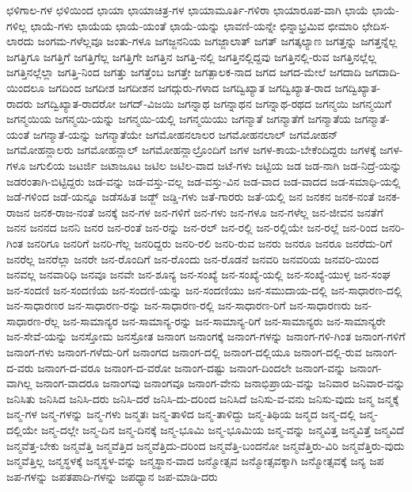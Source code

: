 {ಛಳಿಗಾಲ-ಗಳ
ಛಳಿಯಿಂದ
ಛಾಯಾ
ಛಾಯಾಚಿತ್ರ-ಗಳ
ಛಾಯಾಮೂರ್ತಿ-ಗಳಿರಾ
ಛಾಯಾರೂಪ-ವಾಗಿ
ಛಾಯೆ
ಛಾಯೆ-ಗಳಿಲ್ಲ
ಛಾಯೆ-ಗಳು
ಛಾಯೆಯ
ಛಾಯೆ-ಯಂತೆ
ಛಾಯೆ-ಯನ್ನು
ಛಾವಣಿ-ಯನ್ನೇ
ಛಿನ್ನಾಭ್ರಮಿವ
ಛೀಮಾರಿ
ಛೇದಿಸ-ಲಾರದು
ಜಂಗಮ-ಗಳೆಲ್ಲವೂ
ಜಂತು-ಗಳೂ
ಜಗಜ್ಜನನಿಯ
ಜಗಜ್ಜಾಲಾತ್
ಜಗತ್
ಜಗತ್ಕಲ್ಯಾಣ
ಜಗತ್ತನ್ನು
ಜಗತ್ತನ್ನೆಲ್ಲ
ಜಗತ್ತಿಗೂ
ಜಗತ್ತಿಗೆ
ಜಗತ್ತಿಗೆಲ್ಲ
ಜಗತ್ತಿಗೇ
ಜಗತ್ತಿನ
ಜಗತ್ತಿ-ನಲ್ಲಿ
ಜಗತ್ತಿನಲ್ಲಿದ್ದವು
ಜಗತ್ತಿನಲ್ಲಿ-ರುವ
ಜಗತ್ತಿನಲ್ಲೆಲ್ಲ
ಜಗತ್ತಿನಲ್ಲೆಲ್ಲಾ
ಜಗತ್ತಿ-ನಿಂದ
ಜಗತ್ತು
ಜಗತ್ತೆಂಬ
ಜಗತ್ತೇ
ಜಗತ್ಪಾಲಕ-ನಾದ
ಜಗದ
ಜಗದ-ಮೇಲೆ
ಜಗದಾದಿ
ಜಗದಾದಿ-ಯಿಂದಲೂ
ಜಗದಿಂದ
ಜಗದೀಶ
ಜಗದೀಶನ
ಜಗದ್ಗುರು-ಗಳಾದ
ಜಗದ್ವಿಖ್ಯಾತ
ಜಗದ್ವಿಖ್ಯಾತ-ರಾದ
ಜಗದ್ವಿಖ್ಯಾತ-ರಾದರು
ಜಗದ್ವಿಖ್ಯಾತ-ರಾದರೋ
ಜಗದ್-ವಿಜಯಿ
ಜಗನ್ನಾಥ
ಜಗನ್ನಾಥನ
ಜಗನ್ನಾಥ-ರಥದ
ಜಗನ್ಮಯಿ
ಜಗನ್ಮಯಿಗೆ
ಜಗನ್ಮಯಿಯ
ಜಗನ್ಮಯಿ-ಯನ್ನು
ಜಗನ್ಮಯಿ-ಯಲ್ಲಿ
ಜಗನ್ಮಯಿಯು
ಜಗನ್ಮಾತೆ
ಜಗನ್ಮಾತೆಗೆ
ಜಗನ್ಮಾತೆಯ
ಜಗನ್ಮಾತೆ-ಯಂತೆ
ಜಗನ್ಮಾತೆ-ಯನ್ನು
ಜಗನ್ಮಾತೆಯೇ
ಜಗಮೋಹನಲಾಲರ
ಜಗಮೋಹನಲಾಲ್
ಜಗಮೋಹನ್
ಜಗಮೋಹನ್ಲಾಲರು
ಜಗಮೋಹನ್ಲಾಲ್
ಜಗಮೋಹನ್ಲಾಲ್ರೊಂದಿಗೆ
ಜಗಳ
ಜಗಳ-ಕಾಯ-ಬೇಕೆಂದಿದ್ದರು
ಜಗಳಕ್ಕೆ
ಜಗಳ-ಗಳೂ
ಜಗುಲಿಯ
ಜಟರ್ಜಿ
ಜಟಾಜೂಟ
ಜಟಿಲ
ಜಟಿಲ-ವಾದ
ಜಟೆ-ಗಳು
ಜಟ್ಟಿಯ
ಜಡ
ಜಡ-ನಾಗಿ
ಜಡ-ನಿದ್ರೆ-ಯನ್ನು
ಜಡರಂತಾಗಿ-ಬಿಟ್ಟಿದ್ದರು
ಜಡ-ವನ್ನು
ಜಡ-ವಸ್ತು-ವಲ್ಲ
ಜಡ-ವಸ್ತು-ವಿನ
ಜಡ-ವಾದ
ಜಡ-ವಾದದ
ಜಡ-ಸಮಾಧಿ-ಯಲ್ಲಿ
ಜಡೆ-ಗಳಿಂದ
ಜಡೆ-ಯನ್ನೂ
ಜಡೆಸಹಿತ
ಜಡ್ಜ್
ಜಡ್ಡಿ-ಗಳು
ಜತೆ-ಗಾರರು
ಜತೆ-ಯಲ್ಲಿ
ಜನ
ಜನಕನ
ಜನಕ-ನಂತೆ
ಜನಕ-ರಾಜನ
ಜನಕ-ರಾಜ-ನಂತೆ
ಜನಕ್ಕೆ
ಜನ-ಗಳ
ಜನ-ಗಳಿಗೆ
ಜನ-ಗಳು
ಜನ-ಗಳೂ
ಜನ-ಗಳೆಲ್ಲ
ಜನ-ಜೀವನ
ಜನತೆಗೆ
ಜನನ
ಜನನದ
ಜನನಿ
ಜನರ
ಜನ-ರಂತೆ
ಜನ-ರನ್ನು
ಜನ-ರಲ್
ಜನ-ರಲ್ಲಿ
ಜನ-ರಲ್ಲಿಯೇ
ಜನ-ರಲ್ಲೆ
ಜನ-ರಿಂದ
ಜನರಿ-ಗಿಂತ
ಜನರಿಗೂ
ಜನರಿಗೆ
ಜನರಿ-ಗೆಲ್ಲ
ಜನರಿದ್ದರು
ಜನರಿ-ರಲಿ
ಜನರಿ-ರುವ
ಜನರು
ಜನರೂ
ಜನರೂ
ಜನರೆದು-ರಿಗೆ
ಜನರೆಲ್ಲ
ಜನರೆಲ್ಲಾ
ಜನರೇ
ಜನ-ರೊಂದಿಗೆ
ಜನ-ರೊಂದು
ಜನ-ರೊಡನೆ
ಜನವರಿ
ಜನವರಿಯ
ಜನವರಿ-ಯಿಂದ
ಜನವಲ್ಲ
ಜನವಾರಿಧಿ
ಜನವೂ
ಜನವೇ
ಜನ-ಶೂನ್ಯ
ಜನ-ಸಂಖ್ಯೆ
ಜನ-ಸಂಖ್ಯೆ-ಯಲ್ಲಿ
ಜನ-ಸಂಖ್ಯೆ-ಯುಳ್ಳ
ಜನ-ಸಂಘ
ಜನ-ಸಂದಣಿ
ಜನ-ಸಂದಣಿಯ
ಜನ-ಸಂದಣಿ-ಯನ್ನು
ಜನ-ಸಂದಣಿಯು
ಜನ-ಸಮುದಾಯ-ದಲ್ಲಿ
ಜನ-ಸಾಧಾರಣ-ದಲ್ಲಿ
ಜನ-ಸಾಧಾರಣರ
ಜನ-ಸಾಧಾರಣ-ರನ್ನು
ಜನ-ಸಾಧಾರಣ-ರಲ್ಲಿ
ಜನ-ಸಾಧಾರಣ-ರಿಗೆ
ಜನ-ಸಾಧಾರಣರು
ಜನ-ಸಾಧಾರಣ-ರೆಲ್ಲ
ಜನ-ಸಾಮಾನ್ಯರ
ಜನ-ಸಾಮಾನ್ಯ-ರನ್ನು
ಜನ-ಸಾಮಾನ್ಯ-ರಿಗೆ
ಜನ-ಸಾಮಾನ್ಯರು
ಜನ-ಸಾಮಾನ್ಯರೇ
ಜನ-ಸೇವೆ-ಯನ್ನು
ಜನಸ್ತೋಮ
ಜನಸ್ರೋತ
ಜನಾಂಗ
ಜನಾಂಗಕ್ಕೆ
ಜನಾಂಗ-ಗಳನ್ನು
ಜನಾಂಗ-ಗಳಿ-ಗಿಂತ
ಜನಾಂಗ-ಗಳಿಗೆ
ಜನಾಂಗ-ಗಳು
ಜನಾಂಗ-ಗಳೆದು-ರಿಗೆ
ಜನಾಂಗದ
ಜನಾಂಗ-ದಲ್ಲಿ
ಜನಾಂಗ-ದಲ್ಲಿಯೂ
ಜನಾಂಗ-ದಲ್ಲಿ-ರುವ
ಜನಾಂಗ-ದ-ವರು
ಜನಾಂಗ-ದ-ವರೂ
ಜನಾಂಗ-ದ-ವರೋ
ಜನಾಂಗ-ದಷ್ಟು
ಜನಾಂಗ-ದಿಂದಲೇ
ಜನಾಂಗ-ವನ್ನು
ಜನಾಂಗ-ವಾಗಿಲ್ಲ
ಜನಾಂಗ-ವಾದರೂ
ಜನಾಂಗವು
ಜನಾಂಗವೂ
ಜನಾಂಗ-ವೇನು
ಜನಾಭಿಪ್ರಾಯ-ವನ್ನು
ಜನಿವಾರ
ಜನಿವಾರ-ವನ್ನು
ಜನಿಸಿತು
ಜನಿಸಿದ
ಜನಿಸಿ-ದರು
ಜನಿಸಿ-ದರೆ
ಜನಿಸಿ-ದು-ದರಿಂದ
ಜನಿಸಿದೆ
ಜನಿಸು-ವ-ವನು
ಜನಿಸು-ವುದು
ಜನ್ಮ
ಜನ್ಮಕ್ಕೆ
ಜನ್ಮ-ಗಳ
ಜನ್ಮ-ಗಳನ್ನು
ಜನ್ಮ-ಗಳು
ಜನ್ಮತಃ
ಜನ್ಮ-ತಾಳಿದ
ಜನ್ಮ-ತಾಳಿದ್ದು
ಜನ್ಮ-ತಿಥಿಯ
ಜನ್ಮದ
ಜನ್ಮ-ದಲ್ಲಿ
ಜನ್ಮ-ದಲ್ಲಿಯೇ
ಜನ್ಮ-ದಲ್ಲೇ
ಜನ್ಮ-ದಿನ
ಜನ್ಮ-ದಿನಕ್ಕೆ
ಜನ್ಮ-ಭೂಮಿ
ಜನ್ಮ-ಭೂಮಿಯ
ಜನ್ಮ-ವನ್ನು
ಜನ್ಮವಿತ್ತ
ಜನ್ಮವಿತ್ತೆ
ಜನ್ಮವಿದೆ
ಜನ್ಮವೆತ್ತ-ಬೇಕು
ಜನ್ಮವೆತ್ತಿ
ಜನ್ಮವೆತ್ತಿದ
ಜನ್ಮವೆತ್ತಿದು-ದರಿಂದ
ಜನ್ಮವೆತ್ತಿ-ಬಂದನೋ
ಜನ್ಮವೆತ್ತಿರು-ವಿರಿ
ಜನ್ಮವೆತ್ತಿರು-ವುದು
ಜನ್ಮವೆತ್ತಿಲ್ಲ
ಜನ್ಮಸ್ಥಳಕ್ಕೆ
ಜನ್ಮಸ್ಥಳ-ವನ್ನು
ಜನ್ಮಸ್ಥಾನ-ವಾದ
ಜನ್ಮೋತ್ಸವ
ಜನ್ಮೋತ್ಸವಕ್ಕಾಗಿ
ಜನ್ಮೋತ್ಸವಕ್ಕೆ
ಜನ್ಯ
ಜಪ
ಜಪ-ಗಳನ್ನು
ಜಪತಪಾದಿ-ಗಳನ್ನು
ಜಪಧ್ಯಾನ
ಜಪ-ಮಾಡಿ-ದರು
}
